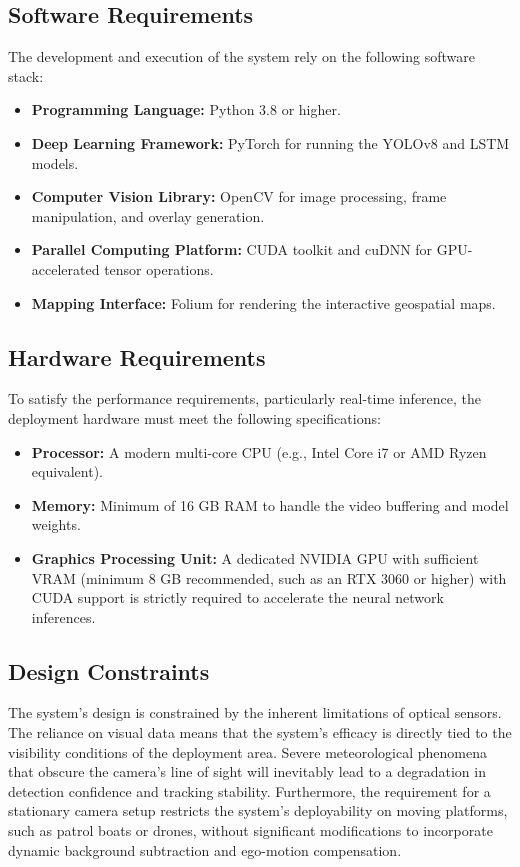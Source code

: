 \subsection{Software Requirements}
The development and execution of the system rely on the following software stack:
\begin{itemize}
    \item \textbf{Programming Language:} Python 3.8 or higher.
    \item \textbf{Deep Learning Framework:} PyTorch for running the YOLOv8 and LSTM models.
    \item \textbf{Computer Vision Library:} OpenCV for image processing, frame manipulation, and overlay generation.
    \item \textbf{Parallel Computing Platform:} CUDA toolkit and cuDNN for GPU-accelerated tensor operations.
    \item \textbf{Mapping Interface:} Folium for rendering the interactive geospatial maps.
\end{itemize}

\subsection{Hardware Requirements}
To satisfy the performance requirements, particularly real-time inference, the deployment hardware must meet the following specifications:
\begin{itemize}
    \item \textbf{Processor:} A modern multi-core CPU (e.g., Intel Core i7 or AMD Ryzen equivalent).
    \item \textbf{Memory:} Minimum of 16 GB RAM to handle the video buffering and model weights.
    \item \textbf{Graphics Processing Unit:} A dedicated NVIDIA GPU with sufficient VRAM (minimum 8 GB recommended, such as an RTX 3060 or higher) with CUDA support is strictly required to accelerate the neural network inferences.
\end{itemize}

\subsection{Design Constraints}
The system's design is constrained by the inherent limitations of optical sensors. The reliance on visual data means that the system's efficacy is directly tied to the visibility conditions of the deployment area. Severe meteorological phenomena that obscure the camera's line of sight will inevitably lead to a degradation in detection confidence and tracking stability. Furthermore, the requirement for a stationary camera setup restricts the system's deployability on moving platforms, such as patrol boats or drones, without significant modifications to incorporate dynamic background subtraction and ego-motion compensation.

